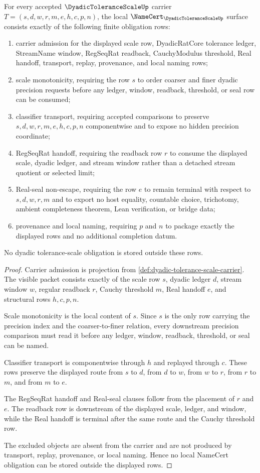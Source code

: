 \begin{theorem}
\label{thm:dyadic-tolerance-scale-namecert-obligations}
For every accepted $\DyadicToleranceScaleUp$ carrier $T=(s,d,w,r,m,e,h,c,p,n)$, the local $\NameCert_{\DyadicToleranceScaleUp}$ surface consists exactly of the following finite obligation rows:
\begin{enumerate}
\item carrier admission for the displayed scale row, DyadicRatCore tolerance ledger, StreamName window, RegSeqRat readback, CauchyModulus threshold, Real handoff, transport, replay, provenance, and local naming rows;
\item scale monotonicity, requiring the row $s$ to order coarser and finer dyadic precision requests before any ledger, window, readback, threshold, or seal row can be consumed;
\item classifier transport, requiring accepted comparisons to preserve $s,d,w,r,m,e,h,c,p,n$ componentwise and to expose no hidden precision coordinate;
\item RegSeqRat handoff, requiring the readback row $r$ to consume the displayed scale, dyadic ledger, and stream window rather than a detached stream quotient or selected limit;
\item Real-seal non-escape, requiring the row $e$ to remain terminal with respect to $s,d,w,r,m$ and to export no host equality, countable choice, trichotomy, ambient completeness theorem, Lean verification, or bridge data;
\item provenance and local naming, requiring $p$ and $n$ to package exactly the displayed rows and no additional completion datum.
\end{enumerate}
No dyadic tolerance-scale obligation is stored outside these rows.
\end{theorem}
\begin{proof}
Carrier admission is projection from \autoref{def:dyadic-tolerance-scale-carrier}. The visible packet consists exactly of the scale row $s$, dyadic ledger $d$, stream window $w$, regular readback $r$, Cauchy threshold $m$, Real handoff $e$, and structural rows $h,c,p,n$.

Scale monotonicity is the local content of $s$. Since $s$ is the only row carrying the precision index and the coarser-to-finer relation, every downstream precision comparison must read it before any ledger, window, readback, threshold, or seal can be named.

Classifier transport is componentwise through $h$ and replayed through $c$. These rows preserve the displayed route from $s$ to $d$, from $d$ to $w$, from $w$ to $r$, from $r$ to $m$, and from $m$ to $e$.

The RegSeqRat handoff and Real-seal clauses follow from the placement of $r$ and $e$. The readback row is downstream of the displayed scale, ledger, and window, while the Real handoff is terminal after the same route and the Cauchy threshold row.

The excluded objects are absent from the carrier and are not produced by transport, replay, provenance, or local naming. Hence no local NameCert obligation can be stored outside the displayed rows.
\end{proof}

